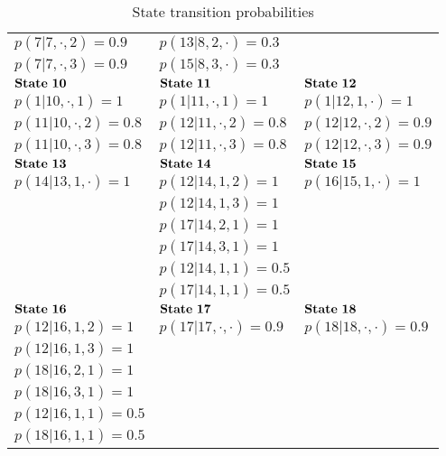 \documentclass{acm_proc_article-sp}
\begin{document}
\begin{table}[htbp]
\begin{tabular}{lll}
$p(7|7,\cdot,2)=0.9$                &$p(13|8,2,\cdot)=0.3$             &$ $\\
$p(7|7,\cdot,3)=0.9$                &$p(15|8,3,\cdot)=0.3$             &$ $\\
$\begin{bf}State~10\end{bf}$         &$\begin{bf}State~11\end{bf}$        &$\begin{bf}State~12\end{bf}$\\
$p(1|10,\cdot,1)=1$                &$p(1|11,\cdot,1)=1$             &$p(1|12,1,\cdot)=1$\\
$p(11|10,\cdot,2)=0.8$                &$p(12|11,\cdot,2)=0.8$             &$p(12|12,\cdot,2)=0.9$\\
$p(11|10,\cdot,3)=0.8$                &$p(12|11,\cdot,3)=0.8$             &$p(12|12,\cdot,3)=0.9$\\
$\begin{bf}State~13\end{bf}$         &$\begin{bf}State~14\end{bf}$        &$\begin{bf}State~15\end{bf}$\\
$p(14|13,1,\cdot)=1$                &$p(12|14,1,2)=1$             &$p(16|15,1,\cdot)=1$\\
$ $                &$p(12|14,1,3)=1$             &$ $\\
$ $                &$p(17|14,2,1)=1$             &$ $\\
$ $                &$p(17|14,3,1)=1$             &$ $\\
$ $                &$p(12|14,1,1)=0.5$             &$ $\\
$ $                &$p(17|14,1,1)=0.5$             &$ $\\
$\begin{bf}State~16\end{bf}$         &$\begin{bf}State~17\end{bf}$        &$\begin{bf}State~18\end{bf}$\\
$p(12|16,1,2)=1$                &$p(17|17,\cdot,\cdot)=0.9$             &$p(18|18,\cdot,\cdot)=0.9$\\
$p(12|16,1,3)=1$                &$ $             &$ $\\
$p(18|16,2,1)=1$                &$ $             &$ $\\
$p(18|16,3,1)=1$                &$ $             &$ $\\
$p(12|16,1,1)=0.5$                &$ $             &$ $\\
$p(18|16,1,1)=0.5$                &$ $             &$ $\\
\hline
\end{tabular}
\caption{\label{statetransition} State transition probabilities}
\end{table}
$ $\\
\end{document}
